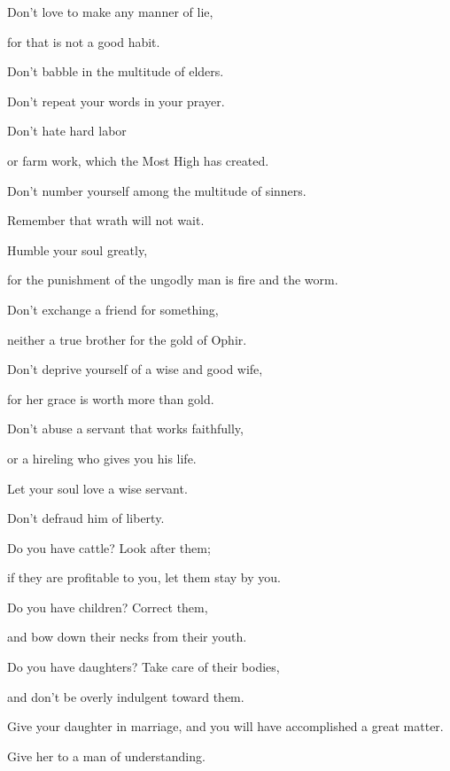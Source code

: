 {\par }{\Q {}Don’t love to make any manner of lie,
\par }{\QB for that is not a good habit.
\par }{\Q {}Don’t babble in the multitude of elders.
\par }{\QB Don’t repeat your words in your prayer.
\par }{\BB \par }{\Q {}Don’t hate hard labor
\par }{\QB or farm work, which the Most High has created.
\par }{\Q {}Don’t number yourself among the multitude of sinners.
\par }{\QB Remember that wrath will not wait.
\par }{\Q {}Humble your soul greatly,
\par }{\QB for the punishment of the ungodly man is fire and the worm.
\par }{\BB \par }{\Q {}Don’t exchange a friend for something,
\par }{\QB neither a true brother for the gold of Ophir.
\par }{\Q {}Don’t deprive yourself of a wise and good wife,
\par }{\QB for her grace is worth more than gold.
\par }{\Q {}Don’t abuse a servant that works faithfully,
\par }{\QB or a hireling who gives you his life.
\par }{\Q {}Let your soul love a wise servant.
\par }{\QB Don’t defraud him of liberty.
\par }{\BB \par }{\Q {}Do you have cattle? Look after them;
\par }{\QB if they are profitable to you, let them stay by you.
\par }{\Q {}Do you have children? Correct them,
\par }{\QB and bow down their necks from their youth.
\par }{\Q {}Do you have daughters? Take care of their bodies,
\par }{\QB and don’t be overly indulgent toward them.
\par }{\Q {}Give your daughter in marriage, and you will have accomplished a great matter.
\par }{\QB Give her to a man of understanding.
}
